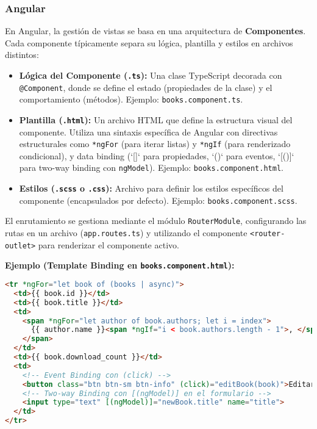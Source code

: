\documentclass[11pt, a4paper]{article}
\begin{document}
\subsubsection{Angular}
En Angular, la gestión de vistas se basa en una arquitectura de \textbf{Componentes}. Cada componente típicamente separa su lógica, plantilla y estilos en archivos distintos:
\begin{itemize}
    \item \textbf{Lógica del Componente (\texttt{.ts}):} Una clase TypeScript decorada con \texttt{@Component}, donde se define el estado (propiedades de la clase) y el comportamiento (métodos). Ejemplo: \texttt{books.component.ts}.
    \item \textbf{Plantilla (\texttt{.html}):} Un archivo HTML que define la estructura visual del componente. Utiliza una sintaxis específica de Angular con directivas estructurales como \texttt{*ngFor} (para iterar    listas) y \texttt{*ngIf} (para renderizado condicional), y data binding (`[]` para propiedades, `()` para eventos, `[()]` para two-way binding con \texttt{ngModel}). Ejemplo: \texttt{books.component.html}.
    
    \item \textbf{Estilos (\texttt{.scss} o \texttt{.css}):} Archivo para definir los estilos específicos del componente (encapsulados por defecto). Ejemplo: \texttt{books.component.scss}.
\end{itemize}
El enrutamiento se gestiona mediante el módulo \texttt{RouterModule}, configurando las rutas en un archivo (\texttt{app.routes.ts}) y utilizando el componente \texttt{<router-outlet>} para renderizar el componente activo.

\textbf{Ejemplo (Template Binding en \texttt{books.component.html}):}
\begin{lstlisting}[language=HTML]
<tr *ngFor="let book of (books | async)">
  <td>{{ book.id }}</td>
  <td>{{ book.title }}</td>
  <td>
    <span *ngFor="let author of book.authors; let i = index">
      {{ author.name }}<span *ngIf="i < book.authors.length - 1">, </span>
    </span>
  </td>
  <td>{{ book.download_count }}</td>
  <td>
    <!-- Event Binding con (click) -->
    <button class="btn btn-sm btn-info" (click)="editBook(book)">Editar</button>
    <!-- Two-way Binding con [(ngModel)] en el formulario -->
    <input type="text" [(ngModel)]="newBook.title" name="title">
  </td>
</tr>
\end{lstlisting}
\end{document}

